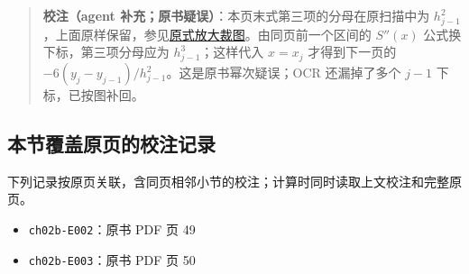 \documentclass[
  10pt,
  fontset=fandol]{ctexart}
\providecommand{\tightlist}{%
  \setlength{\itemsep}{0pt}\setlength{\parskip}{0pt}}
\begin{document}
\begin{quote}
\textbf{校注（agent 补充；原书疑误）}：本页末式第三项的分母在原扫描中为 \(h_{j-1}^2\)，上面原样保留，参见\href{../assets/ch02b/pdf-050-second-derivative-detail.png}{原式放大裁图}。由同页前一个区间的 \(S''(x)\) 公式换下标，第三项分母应为 \(h_{j-1}^3\)；这样代入 \(x=x_j\) 才得到下一页的 \(-6(y_j-y_{j-1})/h_{j-1}^2\)。这是原书幂次疑误；OCR 还漏掉了多个 \(j-1\) 下标，已按图补回。
\end{quote}

\subsection{本节覆盖原页的校注记录}\label{ux672cux8282ux8986ux76d6ux539fux9875ux7684ux6821ux6ce8ux8bb0ux5f55}

下列记录按原页关联，含同页相邻小节的校注；计算时同时读取上文校注和完整原页。

\begin{itemize}
\tightlist
\item
  \texttt{ch02b-E002}：原书 PDF 页 49
\item
  \texttt{ch02b-E003}：原书 PDF 页 50
\end{itemize}
\end{document}
